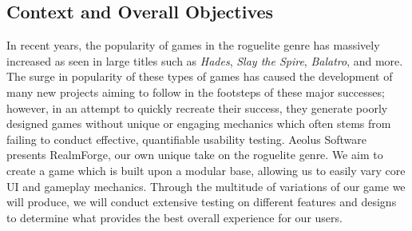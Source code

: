 \subsection*{Context and Overall Objectives}
In recent years, the popularity of games in the roguelite genre has massively increased as seen in large titles such as \textit{Hades}, \textit{Slay the Spire}, \textit{Balatro}, and more. The surge in popularity of these types of games has caused the development of many new projects aiming to follow in the footsteps of these major successes; however, in an attempt to quickly recreate their success, they generate poorly designed games without unique or engaging mechanics which often stems from failing to conduct effective, quantifiable usability testing.
\newline
Aeolus Software presents RealmForge, our own unique take on the roguelite genre. We aim to create a game which is built upon a modular base, allowing us to easily vary core UI and gameplay mechanics. Through the multitude of variations of our game we will produce, we will conduct extensive testing on different features and designs to determine what provides the best overall experience for our users.